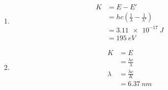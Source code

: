 \documentclass{article}
\begin{document}
\begin{enumerate}
  \item

        \begin{align*}
          K & = E - E'                                                    \\
            & = h c \left( \frac{1}{\lambda} - \frac{1}{\lambda'} \right) \\
            & = \qty{3.11e-17}{J}                                         \\
            & = \qty{195}{eV}
        \end{align*}

  \item

        \begin{align*}
          K       & = E                   \\
                  & = \frac{h c}{\lambda} \\
          \lambda & = \frac{h c}{K}       \\
                  & = \qty{6.37}{nm}
        \end{align*}
\end{enumerate}

\setcounter{subsubsection}{36}
\subsubsection{}
\end{document}
